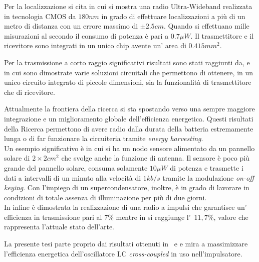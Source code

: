 \documentclass[a4paper, 12pt]{memoir}
\begin{document}
Per la localizzazione si cita\cite{Terada05} in cui si mostra una radio 
Ultra-Wideband realizzata in tecnologia CMOS da $ 180nm $ in grado di
effettuare localizzazioni a più di un metro di distanza con un errore massimo
di $ \pm 2.5cm $.
Quando si effettuano mille misurazioni al secondo il consumo di potenza è pari
a $ 0.7\mu W $. Il trasmettitore e il ricevitore sono integrati in un unico
chip avente un' area di $ 0.415mm^2 $.

Per la trasmissione a corto raggio significativi risultati sono stati raggiunti
da\cite{RabaeyEECS},\cite{Neviani12} e\cite{Gambini12} in cui sono dimostrate
varie soluzioni circuitali che permettono di ottenere, in un unico circuito
integrato di piccole dimensioni, sia la funzionalità di trasmettitore che di
ricevitore.

Attualmente la frontiera della ricerca si sta spostando verso una sempre
maggiore integrazione e un miglioramento globale dell'efficienza energetica.
Questi risultati della Ricerca permettono di avere radio dalla durata della 
batteria estremamente lunga o di far funzionare la circuiteria tramite
\emph{energy harvesting}.\\
Un esempio significativo è\cite{Danesh11} in cui si ha un nodo sensore 
alimentato da un pannello solare di $ 2\times2 cm^2 $ che svolge anche la
funzione di antenna. Il sensore è poco più grande del pannello solare, consuma
solamente $ 10\mu W $ di potenza e trasmette i dati a intervalli di un
minuto alla velocità di $ 1 kb/s $ tramite la modulazione \emph{on-off
keying}.
Con l'impiego di un supercondensatore, inoltre, è in grado di lavorare in
condizioni di totale assenza di illuminazione per più di due giorni.\\
In\cite{Solda10} infine è dimostrata la realizzazione di una radio a impulsi 
che garantisce un' efficienza in trasmissione pari al 7\% mentre in 
\cite{Neviani14} si raggiunge l'~$11,7\%$, valore che rappresenta l'attuale
stato dell'arte.

La presente tesi parte proprio dai risultati ottenuti in~\cite{Neviani12} e
\cite{Neviani14} e mira a massimizzare l'efficienza energetica dell'oscillatore
LC \emph{cross-coupled} in uso nell'impulsatore.
\end{document}
